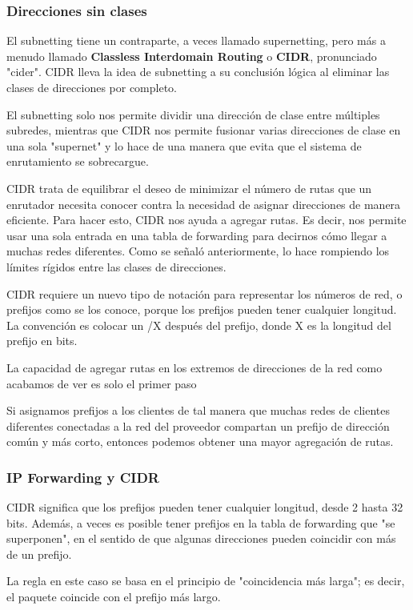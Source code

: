 \subsubsection{Direcciones sin clases}
El subnetting tiene un contraparte, a veces llamado supernetting, pero más a menudo llamado \textbf{Classless Interdomain Routing} o \textbf{CIDR}, pronunciado "cider". CIDR lleva la idea de subnetting a su conclusión lógica al eliminar las clases de direcciones por completo. 

El subnetting solo nos permite dividir una dirección de clase entre múltiples subredes, mientras que CIDR nos permite fusionar varias direcciones de clase en una sola "supernet" y lo hace de una manera que evita que el sistema de enrutamiento se sobrecargue.


CIDR trata de equilibrar el deseo de minimizar el número de rutas que un enrutador necesita conocer contra la necesidad de asignar direcciones de manera eficiente. Para hacer esto, CIDR nos ayuda a agregar rutas. Es decir, nos permite usar una sola entrada en una tabla de forwarding para decirnos cómo llegar a muchas redes diferentes. Como se señaló anteriormente, lo hace rompiendo los límites rígidos entre las clases de direcciones.

CIDR requiere un nuevo tipo de notación para representar los números de red, o prefijos como se los conoce, porque los prefijos pueden tener cualquier longitud. La convención es colocar un /X después del prefijo, donde X es la longitud del prefijo en bits.

La capacidad de agregar rutas en los extremos de direcciones de la red como acabamos de ver es solo el primer paso

Si asignamos prefijos a los clientes de tal manera que muchas redes de clientes diferentes conectadas a la red del proveedor compartan un prefijo de dirección común y más corto, entonces podemos obtener una mayor agregación de rutas.

\subsubsection*{IP Forwarding y CIDR}
CIDR significa que los prefijos pueden tener cualquier longitud, desde 2 hasta 32 bits. Además, a veces es posible tener prefijos en la tabla de forwarding que "se superponen", en el sentido de que algunas direcciones pueden coincidir con más de un prefijo.

La regla en este caso se basa en el principio de "coincidencia más larga"; es decir, el paquete coincide con el prefijo más largo.


